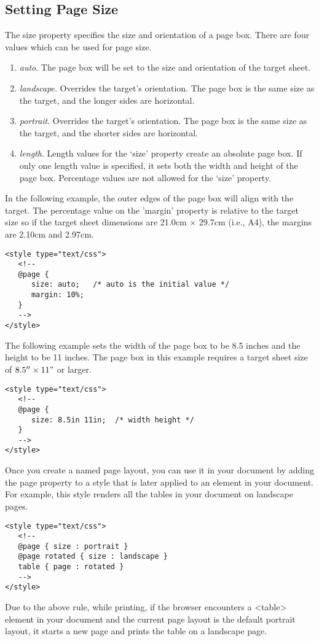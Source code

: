 \documentclass[a4paper,oneside]{book}
\numberwithin{equation}{chapter}
\begin{document}
\subsection{Setting Page Size}
The size property specifies the size and orientation of a page box. There are four values which can be used for page size.
\begin{enumerate}
\item \textit{auto}. The page box will be set to the size and orientation of the target sheet.
\item \textit{landscape}. Overrides the target's orientation. The page box is the same size as the target, and the longer sides are horizontal.
\item \textit{portrait}. Overrides the target's orientation. The page box is the same size as the target, and the shorter sides are horizontal.
\item \textit{length}. Length values for the `size' property create an absolute page box. If only one length value is specified, it sets both the width and height of the page box. Percentage values are not allowed for the `size' property.
\end{enumerate}

In the following example, the outer edges of the page box will align with the target. The percentage value on the 'margin' property is relative to the target size so if the target sheet dimensions are 21.0cm $\times$ 29.7cm (i.e., A4), the margins are 2.10cm and 2.97cm.
\begin{verbatim}
<style type="text/css">
   <!--
   @page {
      size: auto;   /* auto is the initial value */
      margin: 10%;
   }
   -->
</style>
\end{verbatim}
The following example sets the width of the page box to be 8.5 inches and the height to be 11 inches. The page box in this example requires a target sheet size of $8.5''\times  11"$ or larger.
\begin{verbatim}
<style type="text/css">
   <!--
   @page {
      size: 8.5in 11in;  /* width height */
   }
   -->
</style>
\end{verbatim}
Once you create a named page layout, you can use it in your document by adding the page property to a style that is later applied to an element in your document. For example, this style renders all the tables in your document on landscape pages.
\begin{verbatim}
<style type="text/css">
   <!--
   @page { size : portrait }
   @page rotated { size : landscape }
   table { page : rotated }
   -->
</style>
\end{verbatim}
Due to the above rule, while printing, if the browser encounters a <table> element in your document and the current page layout is the default portrait layout, it starts a new page and prints the table on a landscape page.
\end{document}
